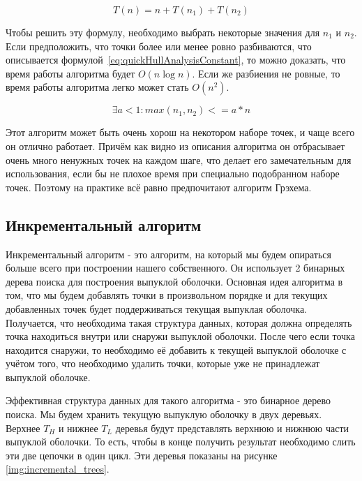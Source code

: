 \begin{equation}\label{eq:quickHullAnalysisBegin}
T(n) = n + T(n_1) + T(n_2)
\end{equation}

Чтобы решить эту формулу, необходимо выбрать некоторые значения для $n_1$ и $n_2$. Если предположить, что точки более или менее ровно разбиваются, что описывается формулой~\ref{eq:quickHullAnalysisConstant}, то можно доказать, что время работы алгоритма будет $O(n \log n)$. Если же разбиения не ровные, то время работы алгоритма легко может стать $O(n^2)$.


\begin{equation}\label{eq:quickHullAnalysisConstant}
\exists  a < 1 : max(n_1, n_2) <= a * n
\end{equation}

Этот алгоритм может быть очень хорош на некотором наборе точек, и чаще всего он отлично работает. Причём как видно из описания алгоритма он отбрасывает очень много ненужных точек на каждом шаге, что делает его замечательным для использования, если бы не плохое время при специально подобранном наборе точек. Поэтому на практике всё равно предпочитают алгоритм Грэхема.

\subsection{Инкрементальный алгоритм} \label{subsect1_1_5}


Инкрементальный алгоритм - это алгоритм, на который мы будем опираться больше всего при построении нашего собственного. Он использует 2 бинарных дерева поиска для построения выпуклой оболочки. Основная идея алгоритма в том, что мы будем добавлять точки в произвольном порядке и для текущих добавленных точек будет поддерживаться текущая выпуклая оболочка. Получается, что необходима такая структура данных, которая должна определять точка находиться внутри или снаружи выпуклой оболочки. После чего если точка находится снаружи, то необходимо её добавить к текущей выпуклой оболочке с учётом того, что необходимо удалить точки, которые уже не принадлежат выпуклой оболочке.

Эффективная структура данных для такого алгоритма - это бинарное дерево поиска. Мы будем хранить текущую выпуклую оболочку в двух деревьях. Верхнее $T_H$ и нижнее $T_L$ деревья будут представлять верхнюю и нижнюю части выпуклой оболочки. То есть, чтобы в конце получить результат необходимо слить эти две цепочки в один цикл. Эти деревья показаны на рисунке \ref{img:incremental_trees}.

